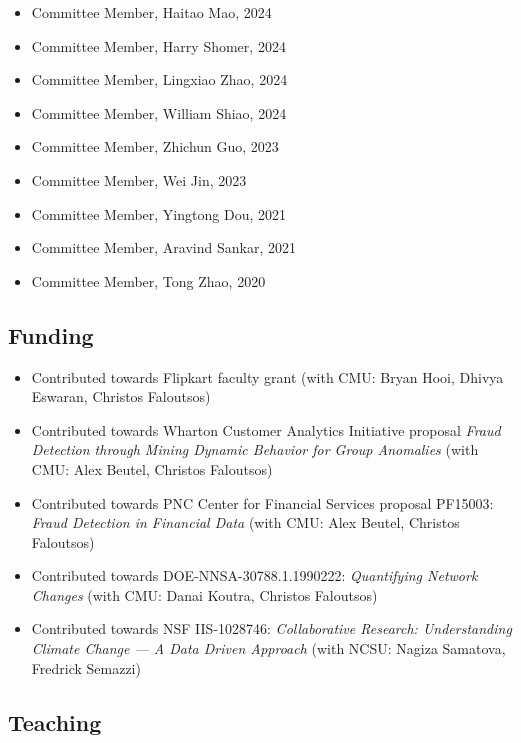 \documentclass{article}
\begin{document}
\begin{itemize}
\item Committee Member, Haitao Mao, 2024
\item Committee Member, Harry Shomer, 2024
\item Committee Member, Lingxiao Zhao, 2024
\item Committee Member, William Shiao, 2024
\item Committee Member, Zhichun Guo, 2023
\item Committee Member, Wei Jin, 2023
\item Committee Member, Yingtong Dou, 2021
\item Committee Member, Aravind Sankar, 2021
\item Committee Member, Tong Zhao, 2020
\end{itemize}

\subsection*{\bf {Funding}}

\begin{itemize}
\item Contributed towards Flipkart faculty grant (with CMU: Bryan Hooi, Dhivya Eswaran, Christos Faloutsos)
\item Contributed towards Wharton Customer Analytics Initiative proposal \emph{Fraud Detection through Mining Dynamic Behavior for Group Anomalies} (with CMU: Alex Beutel, Christos Faloutsos)
\item Contributed towards PNC Center for Financial Services proposal PF15003: \emph{Fraud Detection in Financial Data} (with CMU: Alex Beutel, Christos Faloutsos)
\item Contributed towards DOE-NNSA-30788.1.1990222: \emph{Quantifying Network Changes} (with CMU: Danai Koutra, Christos Faloutsos)
\item Contributed towards NSF IIS-1028746: \emph{Collaborative Research: Understanding Climate Change — A Data Driven Approach} (with NCSU: Nagiza Samatova, Fredrick Semazzi)
\end{itemize}

\subsection*{\bf {Teaching}}
\end{document}
